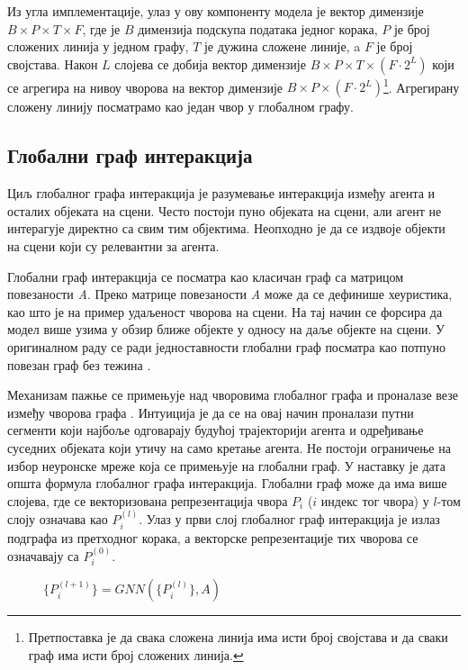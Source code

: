 \documentclass[11pt,oneside]{memoir}
\begin{document}
Из угла имплементације, улаз у ову компоненту модела је вектор димензије $B\times P\times T\times F$,
где је $B$ димензија подскупа података једног корака, 
$P$ је број сложених линија у једном графу, $T$ је дужина сложене линије, a $F$ је број својстава. Након $L$ слојева се добија вектор димензије 
$B\times P\times T\times (F \cdot 2^{L})$ који се агрегира на нивоу чворова на вектор димензије
$B\times P\times (F \cdot 2^{L})$\footnote{Претпоставка је да свака сложена линија има исти број својстава и да сваки граф има исти број сложених линија.}.
Агрегирану сложену линију посматрамо као један чвор у глобалном графу.
         
\subsection{Глобални граф интеракција}

Циљ глобалног графа интеракција је разумевање интеракција између агента и осталих објеката на сцени. Често постоји пуно објеката
на сцени, али агент не интерагује директно са свим тим објектима. Неопходно је да се издвоје објекти на сцени који су релевантни за агента.

Глобални граф интеракција се посматра као класичан граф са матрицом повезаности \textit{A}. Преко матрице повезаности \textit{A}
може да се дефинише хеуристика, као што је на пример удаљеност чворова на сцени. На тај начин се форсира да модел више узима у обзир ближе објекте
у односу на даље објекте на сцени.
У оригиналном раду се ради једноставности глобални граф посматра као потпуно повезан граф без тежина \cite{vectornet}.

Механизам пажње се примењује над
чворовима глобалног графа и проналазе везе између чворова графа \cite{attention_is_all_you_need}. Интуиција је да се на овај начин проналази путни сегменти који најбоље одговарају будућој трајекторији агента и
одређивање суседних објеката који утичу на само кретање агента. Не постоји ограничење на избор неуронске мреже која се примењује на глобални граф.
У наставку је дата општа формула глобалног графа интеракција. Глобални граф може да има више слојева, где
се векторизована репрезентација чвора $P_{i}$ ($i$ индекс тог чвора) у $l$-том слоју означава као $P_{i}^{(l)}$. 
Улаз у први слој глобалног граф интеракција је излаз подграфа из претходног корака, а векторске репрезентације тих чворова се означавају
са $P_{i}^{(0)}$.

\begin{figure}[H]
  \centering
  $\{P^{(l+1)}_{i}\} = GNN(\{P^{(l)}_{i}\}, A)$
\end{figure}
\end{document}
